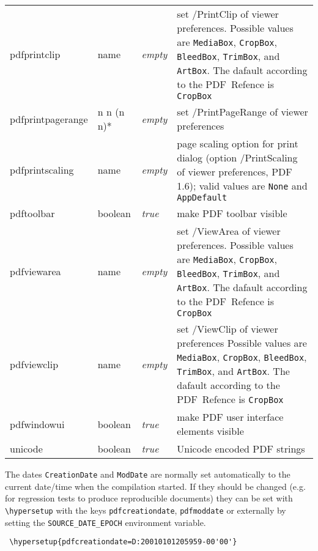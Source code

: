 \documentclass{article}
\begin{document}
\begin{longtable}{@{}>{\ttfamily}l>{\raggedright}p{}>{\itshape}lp{7cm}@{}}
pdfprintclip       & name    & empty & set /PrintClip of viewer preferences.  Possible values are
                                       \verb|MediaBox|, \verb|CropBox|,
                                       \verb|BleedBox|, \verb|TrimBox|, and \verb|ArtBox|.
                                       The dafault according to the PDF~Refence is \verb|CropBox| \\
pdfprintpagerange  & n n (n n)*
                             & empty & set /PrintPageRange of viewer preferences\\
pdfprintscaling    & name    & empty & page scaling option for print dialog
                                       (option /PrintScaling of viewer
                                       preferences, PDF 1.6);
                                       valid values are \verb|None| and
                                       \verb|AppDefault| \\
pdftoolbar         & boolean & true  & make PDF toolbar visible \\
pdfviewarea        & name    & empty & set /ViewArea of viewer preferences. Possible values are
                                       \verb|MediaBox|, \verb|CropBox|,
                                       \verb|BleedBox|, \verb|TrimBox|, and \verb|ArtBox|.
                                       The dafault according to the PDF~Refence is \verb|CropBox| \\
pdfviewclip        & name    & empty & set /ViewClip of viewer preferences Possible values are
                                       \verb|MediaBox|, \verb|CropBox|,
                                       \verb|BleedBox|, \verb|TrimBox|, and \verb|ArtBox|.
                                       The dafault according to the PDF~Refence is \verb|CropBox| \\
pdfwindowui        & boolean & true  & make PDF user interface elements visible \\
unicode            & boolean & true & Unicode encoded PDF strings
\end{longtable}

 The dates \verb|CreationDate| and \verb|ModDate| 
 are normally set automatically to the current date/time when the compilation
 started. If they should be changed
 (e.g. for regression tests to produce reproducible documents) they can
 be set with \verb|\hypersetup| with the keys
 \verb|pdfcreationdate|, \verb|pdfmoddate| or externally by setting the \verb|SOURCE_DATE_EPOCH| environment variable. 

 \begin{verbatim}
 \hypersetup{pdfcreationdate=D:20010101205959-00'00'}
 \end{verbatim}
\end{document}

